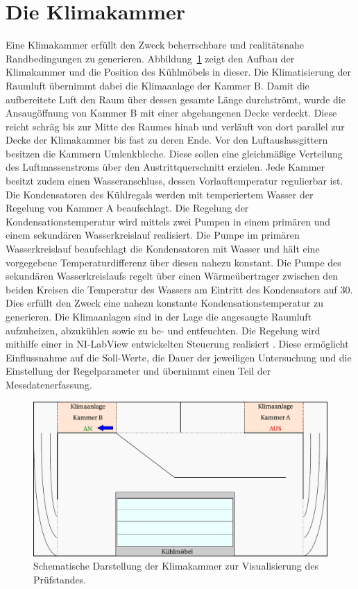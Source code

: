 \clearpage

\section{Die Klimakammer}
\label{sec:Die Klimakammer}

Eine Klimakammer erfüllt den Zweck beherrschbare und realitätsnahe Randbedingungen zu generieren. Abbildung~\ref{fig:Klimakammer} zeigt den Aufbau der Klimakammer und die Position des Kühlmöbels in dieser. Die Klimatisierung der Raumluft übernimmt dabei die Klimaanlage der Kammer B. Damit die aufbereitete Luft den Raum über dessen gesamte Länge durchströmt, wurde die Ansaugöffnung von Kammer B mit einer abgehangenen Decke verdeckt. Diese reicht schräg bis zur Mitte des Raumes hinab und verläuft von dort parallel zur Decke der Klimakammer bis fast zu deren Ende. Vor den Luftauslassgittern besitzen die Kammern Umlenkbleche. Diese sollen eine gleichmäßige Verteilung des Luftmassenstroms über den Austrittquerschnitt erzielen. \newline
Jede Kammer besitzt zudem einen Wasseranschluss, dessen Vorlauftemperatur regulierbar ist. Die Kondensatoren des Kühlregals werden mit temperiertem Wasser der Regelung von Kammer A beaufschlagt. Die Regelung der Kondensationstemperatur wird mittels zwei Pumpen in einem primären und einem sekundären Wasserkreislauf realisiert. Die Pumpe im primären Wasserkreislauf beaufschlagt die Kondensatoren mit Wasser und hält eine vorgegebene Temperaturdifferenz über diesen nahezu konstant. Die Pumpe des sekundären Wasserkreislaufs regelt über einen Wärmeübertrager zwischen den beiden Kreisen die Temperatur des Wassers am Eintritt des Kondensators auf \unit{30}{\celsius}. Dies erfüllt den Zweck eine nahezu konstante Kondensationstemperatur zu generieren.  \newline
Die Klimaanlagen sind in der Lage die angesaugte Raumluft aufzuheizen, abzukühlen sowie zu be- und entfeuchten. Die Regelung wird mithilfe einer in NI-LabView entwickelten Steuerung realisiert \cite{NationalInstruments.2013}. Diese ermöglicht Einflussnahme auf die Soll-Werte, die Dauer der jeweiligen Untersuchung und die Einstellung der Regelparameter und übernimmt einen Teil der Messdatenerfassung. 


\begin{figure}[htb]
\centering
\includegraphics[scale=.6]{Pictures/ClimateChamber.pdf}
\caption{Schematische Darstellung der Klimakammer zur Visualisierung des Prüfstandes.}
\label{fig:Klimakammer}
\end{figure}

